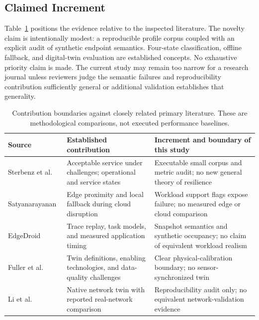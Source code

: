 \subsection{Claimed Increment}
Table~\ref{tab:novelty} positions the evidence relative to the inspected literature. The novelty claim is intentionally modest: a reproducible profile corpus coupled with an explicit audit of synthetic endpoint semantics. Four-state classification, offline fallback, and digital-twin evaluation are established concepts. No exhaustive priority claim is made. The current study may remain too narrow for a research journal unless reviewers judge the semantic failures and reproducibility contribution sufficiently general or additional validation establishes that generality.

\begin{table}[t]
\centering\caption{Contribution boundaries against closely related primary literature. These are methodological comparisons, not executed performance baselines.}\label{tab:novelty}
\small\begin{tabular}{p{}p{}p{}}\toprule
Source & Established contribution & Increment and boundary of this study \\\midrule
Sterbenz et al.~\cite{sterbenz2010} & Acceptable service under challenges; operational and service states & Executable small corpus and metric audit; no new general theory of resilience \\
Satyanarayanan~\cite{satyanarayanan2017} & Edge proximity and local fallback during cloud disruption & Workload support flags expose failure; no measured edge or cloud comparison \\
EdgeDroid~\cite{olguin2019} & Trace replay, task models, and measured application timing & Snapshot semantics and synthetic occupancy; no claim of equivalent workload realism \\
Fuller et al.~\cite{fuller2020} & Twin definitions, enabling technologies, and data-quality challenges & Clear physical-calibration boundary; no sensor-synchronized twin \\
Li et al.~\cite{li2025} & Native network twin with reported real-network comparison & Reproducibility audit only; no equivalent network-validation evidence \\
\bottomrule\end{tabular}
\end{table}

